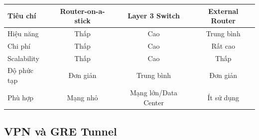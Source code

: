 \begin{center}
\begin{tabular}{|l|c|c|c|}
\hline
\textbf{Tiêu chí} & \textbf{Router-on-a-stick} & \textbf{Layer 3 Switch} & \textbf{External Router} \\
\hline
Hiệu năng & Thấp & Cao & Trung bình \\
\hline
Chi phí & Thấp & Cao & Rất cao \\
\hline
Scalability & Thấp & Cao & Thấp \\
\hline
Độ phức tạp & Đơn giản & Trung bình & Đơn giản \\
\hline
Phù hợp & Mạng nhỏ & Mạng lớn/Data Center & Ít sử dụng \\
\hline
\end{tabular}
\end{center}

\subsection{VPN và GRE Tunnel}
